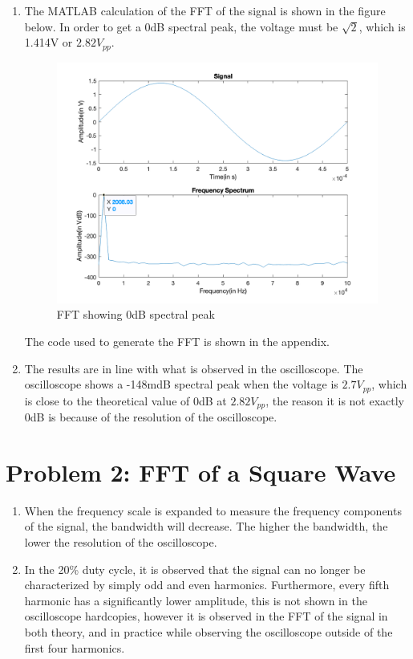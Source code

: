\begin{enumerate}
    \item The MATLAB calculation of the FFT of the signal is shown in the figure below. In order to get a 0dB spectral peak, the voltage must be $\sqrt{2}$, which is 1.414V or $2.82V_{pp}$.
          \begin{figure}[H]
              \centering
              \includegraphics[width=0.75\linewidth]{images/evaluation_problem3.png}
              \caption{FFT showing 0dB spectral peak}
              \label{fig:fft_0dB_spectral_peak}
          \end{figure}
          The code used to generate the FFT is shown in the appendix.
    \item The results are in line with what is observed in the oscilloscope. The oscilloscope shows a -148mdB spectral peak when the voltage is $2.7V_{pp}$, which is close to the theoretical value of 0dB at $2.82V_{pp}$, the reason it is not exactly 0dB is because of the resolution of the oscilloscope.
\end{enumerate}

\section{Problem 2: FFT of a Square Wave}
\begin{enumerate}
    \item When the frequency scale is expanded to measure the frequency components of the signal, the bandwidth will decrease. The higher the bandwidth, the lower the resolution of the oscilloscope.
    \item In the 20\% duty cycle, it is observed that the signal can no longer be characterized by simply odd and even harmonics. Furthermore, every fifth harmonic has a significantly lower amplitude, this is not shown in the oscilloscope hardcopies, however it is observed in the FFT of the signal in both theory, and in practice while observing the oscilloscope outside of the first four harmonics.
\end{enumerate}

